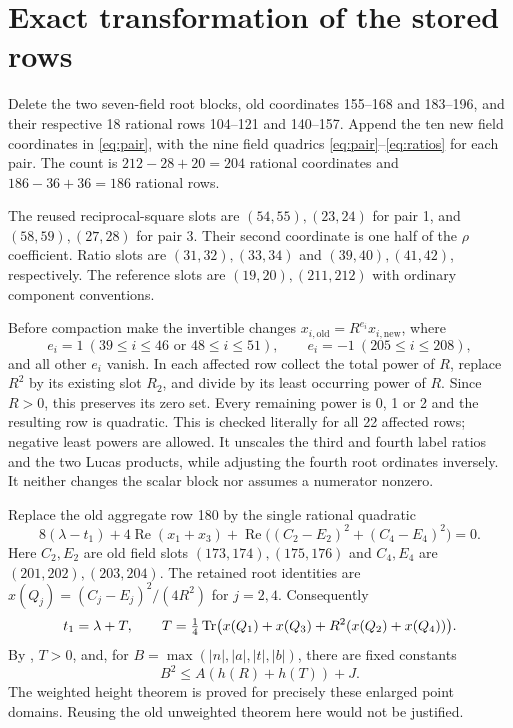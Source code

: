 \documentclass[11pt,a4paper]{article}
\begin{document}
\section{Exact transformation of the stored rows}
Delete the two seven-field root blocks, old coordinates 155--168 and
183--196, and their respective 18 rational rows 104--121 and 140--157.
Append the ten new field coordinates in \eqref{eq:pair}, with the
nine field quadrics \eqref{eq:pair}--\eqref{eq:ratios} for each pair.
The count is $212-28+20=204$ rational coordinates and
$186-36+36=186$ rational rows.

The reused reciprocal-square slots are $(54,55),(23,24)$ for pair 1,
and $(58,59),(27,28)$ for pair 3. Their second coordinate is one half
of the $\rho$ coefficient. Ratio slots are $(31,32),(33,34)$ and
$(39,40),(41,42)$, respectively. The reference slots are
$(19,20),(211,212)$ with ordinary component conventions.

Before compaction make the invertible changes
$x_{i,\mathrm{old}}=R^{e_i}x_{i,\mathrm{new}}$, where
\[
 e_i=1\ (39\le i\le46\text{ or }48\le i\le51),\qquad
 e_i=-1\ (205\le i\le208),
\]
and all other $e_i$ vanish. In each affected row collect the total
power of $R$, replace $R^2$ by its existing slot $R_2$, and divide
by its least occurring power of $R$. Since $R>0$, this preserves its
zero set. Every remaining power is 0, 1 or 2 and the resulting row
is quadratic. This is checked literally for all 22 affected rows;
negative least powers are allowed. It unscales the third and fourth
label ratios and the two Lucas products, while adjusting the fourth
root ordinates inversely. It neither changes the scalar block nor
assumes a numerator nonzero.

Replace the old aggregate row 180 by the single rational quadratic
\begin{equation}\label{eq:aggregate}
 8(\lambda-t_1)+4\operatorname{Re}(x_1+x_3)
 +\operatorname{Re}\bigl((C_2-E_2)^2+(C_4-E_4)^2\bigr)=0.
\end{equation}
Here $C_2,E_2$ are old field slots $(173,174),(175,176)$ and
$C_4,E_4$ are $(201,202),(203,204)$. The retained root identities are
$x(Q_j)=(C_j-E_j)^2/(4R^2)$ for $j=2,4$. Consequently
\[
 t_1=\lambda+T,\qquad
 T=\tfrac14\operatorname{Tr}\bigl(x(Q_1)+x(Q_3)+R^2(x(Q_2)+x(Q_4))\bigr).
\]
By \cite[Corollary~4.1]{Weighted}, $T>0$, and, for
$B=\max(|n|,|a|,|t|,|b|)$, there are fixed constants
\begin{equation}\label{eq:weighted}
                         B^2\le A(h(R)+h(T))+J.
\end{equation}
The weighted height theorem is proved for precisely these enlarged
point domains. Reusing the old unweighted theorem here would not be
justified.
\end{document}
